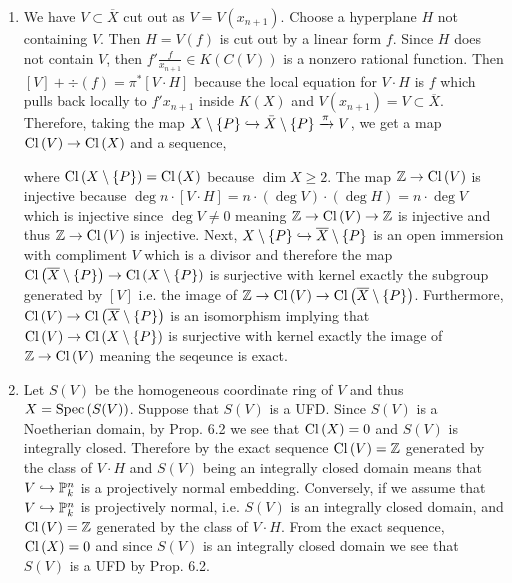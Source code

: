 \documentclass[12pt]{article}
\begin{document}
\begin{enumerate}
\item We have $V \subset \overline{X}$ cut out as $V = V(x_{n+1})$. Choose a hyperplane $H$ not containing $V$. Then $H = V(f)$ is cut out by a linear form $f$. Since $H$ does not contain $V$, then $f' \frac{f}{x_{n+1}} \in K(C(V))$ is a nonzero rational function. Then $[V] + \div{(f)} = \pi^* [V \cdot H]$ because the local equation for $V \cdot H$ is $f$ which pulls back locally to $f' x_{n+1}$ inside $K(X)$ and $V(x_{n+1}) = V \subset \overline{X}$. Therefore, taking the map $X \setminus \{ P \} \hookrightarrow \bar{X} \setminus \{ P \} \xrightarrow{\pi} V$, we get a map $\mathrm{Cl} \left( V \right) \to \mathrm{Cl} \left( X \right)$ and a sequence,
\begin{center}
\end{center}
where $\mathrm{Cl} \left( X \setminus \{ P \} \right) = \mathrm{Cl} \left( X \right)$ because $\dim{X} \ge 2$.
The map $\mathbb{Z} \to \mathrm{Cl} \left( V \right)$ is injective because $\deg{n \cdot [V \cdot H]} = n \cdot (\deg{V}) \cdot  (\deg{H}) = n \cdot \deg{V}$ which is injective since $\deg{V} \neq 0$ meaning $\mathbb{Z} \to \mathrm{Cl} \left( V \right) \to \mathbb{Z}$ is injective and thus $\mathbb{Z} \to \mathrm{Cl} \left( V \right)$ is injective. Next, $X \setminus \{ P \} \hookrightarrow \overline{X} \setminus \{ P \}$ is an open immersion with compliment $V$ which is a divisor and therefore the map $\mathrm{Cl} \left( \overline{X} \setminus \{ P \} \right) \to \mathrm{Cl} \left( X \setminus \{ P \} \right)$ is surjective with kernel exactly the subgroup generated by $[V]$ i.e. the image of $\mathbb{Z} \to \mathrm{Cl} \left( V \right) \to \mathrm{Cl} \left( \overline{X} \setminus \{ P \} \right)$. Furthermore, $\mathrm{Cl} \left( V \right) \to \mathrm{Cl} \left( \overline{X} \setminus \{ P \} \right)$ is an isomorphism implying that $\mathrm{Cl} \left( V \right) \to \mathrm{Cl} \left( X \setminus \{ P \} \right)$ is surjective with kernel exactly the image of $\mathbb{Z} \to \mathrm{Cl} \left( V \right)$ meaning the seqeunce is exact.

\item Let $S(V)$ be the homogeneous coordinate ring of $V$ and thus $X = \mathrm{Spec}\left( S(V) \right)$. Suppose that $S(V)$ is a UFD. Since $S(V)$ is a Noetherian domain, by Prop. 6.2 we see that $\mathrm{Cl} \left( X \right) = 0$ and $S(V)$ is integrally closed. Therefore by the exact sequence $\mathrm{Cl} \left( V \right) = \mathbb{Z}$ generated by the class of $V \cdot H$ and $S(V)$ being an integrally closed domain means that $V \hookrightarrow \mathbb{P}^n_k$ is a projectively normal embedding. Conversely, if we assume that $V \hookrightarrow \mathbb{P}^n_k$ is projectively normal, i.e. $S(V)$ is an integrally closed domain, and $\mathrm{Cl} \left( V \right) = \mathbb{Z}$ generated by the class of $V \cdot H$. From the exact sequence, $\mathrm{Cl} \left( X \right) = 0$ and since $S(V)$ is an integrally closed domain we see that $S(V)$ is a UFD by Prop. 6.2.  


\end{enumerate}
\end{document}
